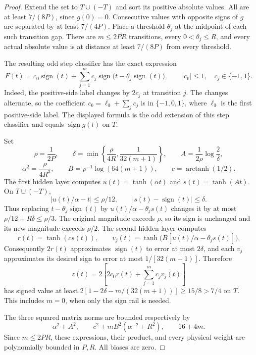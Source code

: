 \begin{proof}
Extend the set to $T\cup(-T)$ and sort its positive absolute values.
All are at least $7/(8P)$, since $g(0)=0$. Consecutive values with
opposite signs of $g$ are separated by at least $7/(4P)$.
Place a threshold $\theta_j$ at the midpoint of each such transition
gap. There are $m\le2PR$ transitions, every $0<\theta_j\le R$,
and every actual absolute value is at distance at least $7/(8P)$
from every threshold.

The resulting odd step classifier has the exact expression
\[
 F(t)=c_0\operatorname{sign}(t)+
   \sum_{j=1}^m c_j\operatorname{sign}
       \bigl(t-\theta_j\operatorname{sign}(t)\bigr),
 \qquad |c_0|\le1,\quad c_j\in\{-1,1\}.
\]
Indeed, the positive-side label changes by $2c_j$ at transition $j$.
The changes alternate, so the coefficient
$c_0=\ell_0+\sum_jc_j$ is in $\{-1,0,1\}$, where $\ell_0$ is the
first positive-side label. The displayed formula is the odd extension
of this step classifier and equals $\operatorname{sign}g(t)$ on $T$.

Set
\[
 \rho=\frac1{2P},\qquad
 \delta=\min\left\{\frac\rho{4R},\frac1{32(m+1)}\right\},\qquad
 A=\frac1{2\rho}\log\frac2\delta,
\]
\[
 \alpha^2=\frac\rho{4R^3},\qquad
 B=\rho^{-1}\log(64(m+1)),\qquad
 c=\operatorname{arctanh}(1/2).
\]
The first hidden layer computes
$u(t)=\tanh(\alpha t)$ and $s(t)=\tanh(At)$.
On $T\cup(-T)$,
\[
 |u(t)/\alpha-t|\le\rho/12,
 \qquad |s(t)-\operatorname{sign}(t)|\le\delta.
\]
Thus replacing $t-\theta_j\operatorname{sign}(t)$ by
$u(t)/\alpha-\theta_js(t)$ changes it by at most
$\rho/12+R\delta\le\rho/3$. The original magnitude exceeds $\rho$,
so its sign is unchanged and its new magnitude exceeds $\rho/2$.
The second hidden layer computes
\[
 r(t)=\tanh(cs(t)),\qquad
 v_j(t)=\tanh\bigl(B[u(t)/\alpha-\theta_js(t)]\bigr).
\]
Consequently $2r(t)$ approximates $\operatorname{sign}(t)$ to error
at most $2\delta$, and each $v_j$ approximates its desired sign to
error at most $1/[32(m+1)]$. Therefore
\[
 z(t)=2\left[2c_0r(t)+\sum_{j=1}^m c_jv_j(t)\right]
\]
has signed value at least
$2[1-2\delta-m/(32(m+1))]\ge15/8>7/4$ on $T$.
This includes $m=0$, when only the sign rail is needed.

The three squared matrix norms are bounded respectively by
\[
 \alpha^2+A^2,\qquad
 c^2+mB^2(\alpha^{-2}+R^2),\qquad 16+4m.
\]
Since $m\le2PR$, these expressions, their product, and every physical
weight are polynomially bounded in $P,R$. All biases are zero.
\end{proof}

